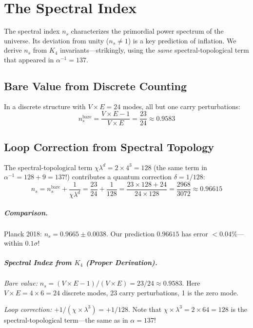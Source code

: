 \documentclass[11pt,a4paper]{book}
\begin{document}
\chapter{The Spectral Index}
\label{chap:spectral-index}

The spectral index $n_s$ characterizes the primordial power spectrum of the universe. 
Its deviation from unity ($n_s \neq 1$) is a key prediction of inflation. We derive 
$n_s$ from $K_4$ invariants—strikingly, using the \emph{same} spectral-topological 
term that appeared in $\alpha^{-1} = 137$.

\section{Bare Value from Discrete Counting}

In a discrete structure with $V \times E = 24$ modes, all but one carry perturbations:
\[
n_s^{\text{bare}} = \frac{V \times E - 1}{V \times E} = \frac{23}{24} \approx 0.9583
\]

\section{Loop Correction from Spectral Topology}

The spectral-topological term $\chi \lambda^d = 2 \times 4^3 = 128$ (the same term 
in $\alpha^{-1} = 128 + 9 = 137$!) contributes a quantum correction $\delta = 1/128$:
\[
n_s = n_s^{\text{bare}} + \frac{1}{\chi \lambda^d} = \frac{23}{24} + \frac{1}{128}
    = \frac{23 \times 128 + 24}{24 \times 128} = \frac{2968}{3072} \approx 0.96615
\]

\paragraph{Comparison.} Planck 2018: $n_s = 0.9665 \pm 0.0038$. 
Our prediction $0.96615$ has error $< 0.04\%$—within $0.1\sigma$!

\paragraph{Spectral Index from $K_4$ (Proper Derivation).}
\emph{Bare value:} $n_s = (V \times E - 1)/(V \times E) = 23/24 \approx 0.9583$.
Here $V \times E = 4 \times 6 = 24$ discrete modes, 23 carry perturbations, 1 is the zero mode.

\emph{Loop correction:} $+1/(\chi \times \lambda^3) = +1/128$.
Note that $\chi \times \lambda^3 = 2 \times 64 = 128$ is the spectral-topological term---the same as in $\alpha = 137$!
\end{document}
